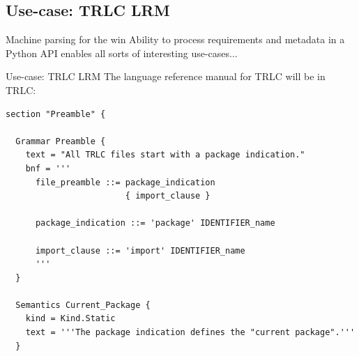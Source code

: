 \documentclass[aspectratio=169]{beamer}
\begin{document}
\subsection{Use-case: TRLC LRM}
\begin{frame}{Machine parsing for the win}
  Ability to process requirements and metadata in a Python API enables
  all sorts of interesting use-cases...
\end{frame}

\begin{frame}[fragile]{Use-case: TRLC LRM}
  The language reference manual for TRLC will be in TRLC:
  \begin{lstlisting}
section "Preamble" {

  Grammar Preamble {
    text = "All TRLC files start with a package indication."
    bnf = '''
      file_preamble ::= package_indication
                        { import_clause }

      package_indication ::= 'package' IDENTIFIER_name

      import_clause ::= 'import' IDENTIFIER_name
      '''
  }

  Semantics Current_Package {
    kind = Kind.Static
    text = '''The package indication defines the "current package".'''
  }
  \end{lstlisting}
  \pause
\end{frame}
\end{document}

